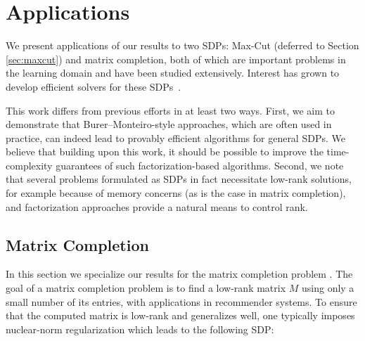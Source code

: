 \section{Applications}\label{sec:applications}

We present applications of our results to two SDPs: Max-Cut (deferred to Section \ref{sec:maxcut}) and matrix completion, both of which are important problems in the learning domain and have been studied extensively. Interest has grown to develop efficient solvers for these SDPs~\citep{arora2007combinatorial, pmlr-v65-mei17a, hardt2013understanding, bandeira2016low}. 


This work differs from previous efforts in at least two ways. First, we aim to demonstrate that Burer--Monteiro-style approaches, which are often used in practice, can indeed lead to provably efficient algorithms for general SDPs. We believe that building upon this work, it should be possible to improve the time-complexity guarantees of such factorization-based algorithms. Second, we note that several problems formulated as SDPs in fact necessitate low-rank solutions, for example because of memory concerns (as is the case in matrix completion),  and factorization approaches provide a natural means to control rank. %


\subsection{Matrix Completion}
In this section we specialize our results for the matrix completion problem \cite{candes2009exact}. The goal of a matrix completion problem is to find a low-rank matrix $M$ using only a small number of its entries, with applications in recommender systems. To ensure that the computed matrix is low-rank and generalizes well, one typically imposes nuclear-norm regularization which leads to the following SDP: 

